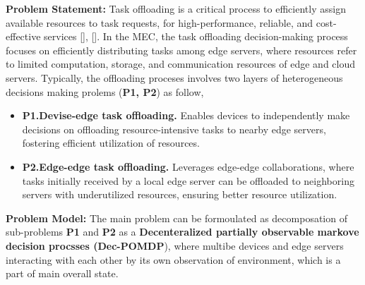 \documentclass[12pt]{article}
\begin{document}
\vspace{2mm}

\noindent\textbf{\large Problem Statement: }
\noindent
Task offloading is a critical process to efficiently assign available resources to task requests, for high-performance, reliable, and cost-effective services [], []. In the MEC, the task offloading decision-making process focuses on efficiently distributing tasks among edge servers, where resources refer to limited computation, storage, and communication resources of edge and cloud servers. Typically, the offloading proceses involves two layers of heterogeneous decisions making prolems (\textbf{P1, P2}) as follow,
\vspace{-2mm}
\begin{itemize}
\item\textbf{P1.\hspace{2mm}Devise-edge task offloading.} Enables devices to independently make decisions on offloading resource-intensive tasks to nearby edge servers, fostering efficient utilization of resources.\vspace{-2mm}
\item\textbf{P2.\hspace{2mm}Edge-edge task offloading.} Leverages edge-edge collaborations, where tasks initially received by a local edge server can be offloaded to neighboring servers with underutilized resources, ensuring better resource utilization. %
\end{itemize}

\noindent\textbf{\large Problem Model: }
\noindent
The main problem can be formoulated as decomposation of sub-problems \textbf{P1} and \textbf{P2} as a \textbf{Decenteralized partially observable markove decision procsses (Dec-POMDP}), where multibe devices and edge servers interacting with each other by its own observation of environment, which is a part of main overall state. 

\vspace{3mm}
\end{document}
